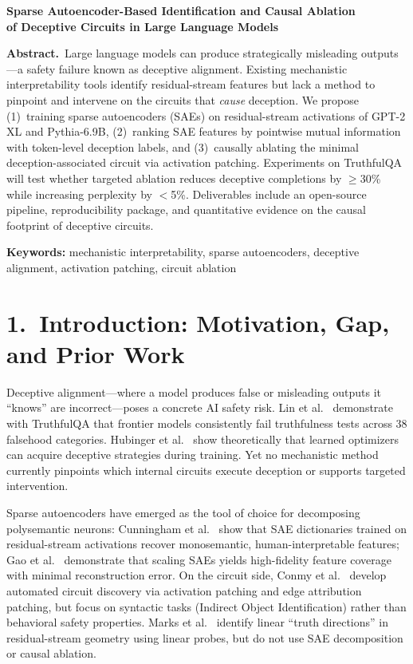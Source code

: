 \documentclass[11pt]{article}
\begin{document}
\begin{center}
{\large\bfseries Sparse Autoencoder-Based Identification and Causal Ablation\\
of Deceptive Circuits in Large Language Models}\\[4pt]
\end{center}

\noindent\textbf{Abstract.}~Large language models can produce strategically misleading outputs---a safety failure known as deceptive alignment. Existing mechanistic interpretability tools identify residual-stream features but lack a method to pinpoint and intervene on the circuits that \emph{cause} deception. We propose (1)~training sparse autoencoders (SAEs) on residual-stream activations of GPT-2 XL and Pythia-6.9B, (2)~ranking SAE features by pointwise mutual information with token-level deception labels, and (3)~causally ablating the minimal deception-associated circuit via activation patching. Experiments on TruthfulQA will test whether targeted ablation reduces deceptive completions by $\geq$30\% while increasing perplexity by $<$5\%. Deliverables include an open-source pipeline, reproducibility package, and quantitative evidence on the causal footprint of deceptive circuits.

\smallskip
\noindent\textbf{Keywords:} mechanistic interpretability, sparse autoencoders, deceptive alignment, activation patching, circuit ablation

\section*{1.~Introduction: Motivation, Gap, and Prior Work}

Deceptive alignment---where a model produces false or misleading outputs it ``knows'' are incorrect---poses a concrete AI safety risk. Lin et al.~\cite{lin2021} demonstrate with TruthfulQA that frontier models consistently fail truthfulness tests across 38 falsehood categories. Hubinger et al.~\cite{hubinger2019} show theoretically that learned optimizers can acquire deceptive strategies during training. Yet no mechanistic method currently pinpoints which internal circuits execute deception or supports targeted intervention.

Sparse autoencoders have emerged as the tool of choice for decomposing polysemantic neurons: Cunningham et al.~\cite{cunningham2023} show that SAE dictionaries trained on residual-stream activations recover monosemantic, human-interpretable features; Gao et al.~\cite{gao2024} demonstrate that scaling SAEs yields high-fidelity feature coverage with minimal reconstruction error. On the circuit side, Conmy et al.~\cite{conmy2023} develop automated circuit discovery via activation patching and edge attribution patching, but focus on syntactic tasks (Indirect Object Identification) rather than behavioral safety properties. Marks et al.~\cite{marks2023} identify linear ``truth directions'' in residual-stream geometry using linear probes, but do not use SAE decomposition or causal ablation.
\end{document}
